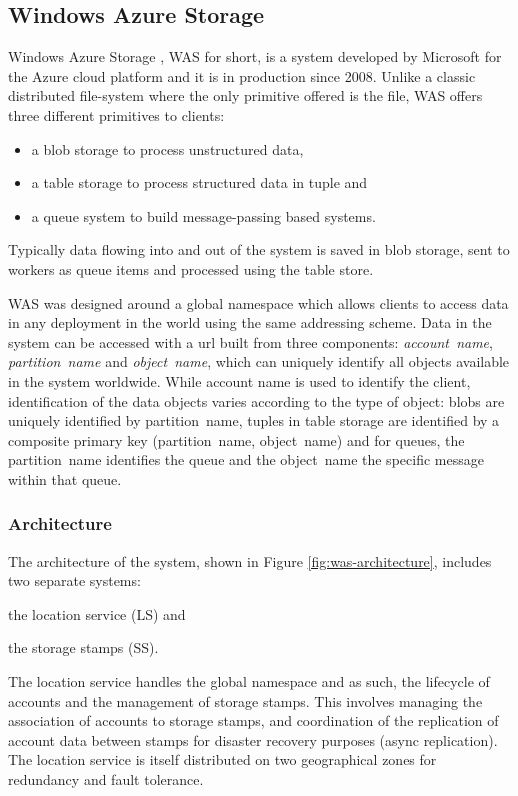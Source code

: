 \subsection{Windows Azure Storage}
Windows Azure Storage \cite{DBLP:conf/sosp/CalderWONSMXSWSHUKEBMAAHHBDAMSMR11}, WAS for short, is a system developed by Microsoft for the Azure cloud platform and it is in production since 2008.
Unlike a classic distributed file-system where the only primitive offered is the file, WAS offers three different primitives to clients:
\begin{itemize}
    \item a blob storage to process unstructured data,
    \item a table storage to process structured data in tuple and
    \item a queue system to build message-passing based systems.
\end{itemize}
Typically data flowing into and out of the system is saved in blob storage, sent to workers as queue items and processed using the table store.

WAS was designed around a global namespace which allows clients to access data in any deployment in the world using the same addressing scheme.
Data in the system can be accessed with a url built from three components: \emph{account~name}, \emph{partition~name} and \emph{object~name}, which can uniquely identify all objects available in the system worldwide.
While account name is used to identify the client, identification of the data objects varies according to the type of object: blobs are uniquely identified by partition~name, tuples in table storage are identified by a composite primary key (partition~name, object~name) and for queues, the partition~name identifies the queue and the object~name the specific message within that queue.

\subsubsection{Architecture}
The architecture of the system, shown in Figure \ref{fig:was-architecture}, includes two separate systems:
\begin{inparaenum}[i)]
    \item the location service (LS) and
    \item the storage stamps (SS).
\end{inparaenum}
The location service handles the global namespace and as such, the lifecycle of accounts and the management of storage stamps.
This involves managing the association of accounts to storage stamps, and coordination of the replication of account data between stamps for disaster recovery purposes (async replication).
The location service is itself distributed on two geographical zones for redundancy and fault tolerance.

